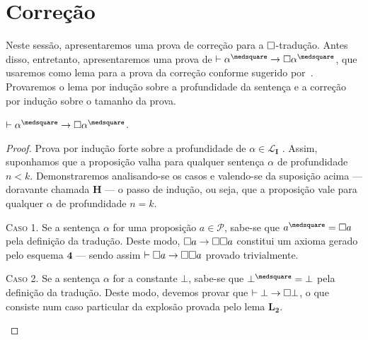 \section{Correção}

    Neste sessão, apresentaremos uma prova de correção para a $\Box$-tradução. Antes disso, entretanto, apresentaremos uma prova de $\entails\alpha^\medsquare\to\nec\alpha^\medsquare$, que usaremos como lema para a prova da correção conforme sugerido por~\cite{Troelstra}. Provaremos o lema por indução sobre a profundidade da sentença e a correção por indução sobre o tamanho da prova.

    \begin{lemma}\label{square-nec}
        $\entails\alpha^\medsquare\to\nec\alpha^\medsquare$.

        \begin{proof}
            Prova por indução forte sobre a profundidade de $\alpha\in\mathcal{L}_\mathbf{I}$ \citep{Troelstra}.
            Assim, suponhamos que a proposição valha para qualquer sentença $\alpha$ de profundidade $n<k$.
            Demonstraremos analisando-se os casos e valendo-se da suposição acima --- doravante chamada $\mathbf{H}$ --- o passo de indução, ou seja, que a proposição vale para qualquer $\alpha$ de profundidade $n=k$.

            \begin{case}
                \textsc{Caso 1.}
                Se a sentença $\alpha$ for uma proposição $a\in\mathcal{P}$, sabe-se que $a^\medsquare=\nec a$ pela definição da tradução.
                Deste modo, $\Box{a}\to\Box\Box{a}$ constitui um axioma gerado pelo esquema \hyperref[MB3]{$\mathbf{4}$} --- sendo assim $\mathrel{\vdash}\Box{a}\to\Box\Box{a}$ provado trivialmente.
            \end{case}

            \begin{case}
                \textsc{Caso 2.}
                Se a sentença $\alpha$ for a constante $\bot$, sabe-se que $\bot^\medsquare=\bot$ pela definição da tradução.
                Deste modo, devemos provar que $\mathrel{\vdash}\bot\to\Box\bot$, o que consiste num caso particular da explosão provada pelo lema \hyperref[explosion]{$\mathbf{L_2}$}.
            \end{case}


\end{proof}
\end{lemma}
